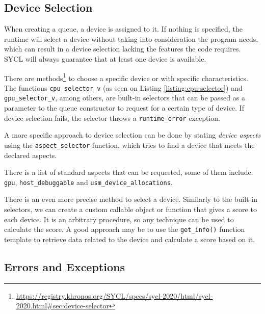 \subsection{Device Selection}

When creating a queue, a device is assigned to it.
If nothing is specified, the runtime will select a device without taking into consideration the program needs, which can result in a device selection lacking the features the code requires.
SYCL will always guarantee that at least one device is available.

There are methods\footnote{\url{https://registry.khronos.org/SYCL/specs/sycl-2020/html/sycl-2020.html\#sec:device-selector}} to choose a specific device or with specific characteristics.
The functions \texttt{cpu\_selector\_v} (as seen on Listing \ref{listing:cpu-selector}) and \texttt{gpu\_selector\_v}, among others, are built-in selectors that can be passed as a parameter to the queue constructor to request for a certain type of device.
If device selection fails, the selector throws a \texttt{runtime\_error} exception.
\pagebreak



A more specific approach to device selection can be done by stating \textit{device aspects} using the \texttt{aspect\_selector} function, which tries to find a device that meets the declared aspects.

There is a list of standard aspects that can be requested, some of them include: \texttt{gpu}, \texttt{host\_debuggable} and \texttt{usm\_device\_allocations}.

There is an even more precise method to select a device.
Similarly to the built-in selectors, we can create a custom callable object or function that gives a score to each device.
It is an arbitrary procedure, so any technique can be used to calculate the score.
A good approach may be to use the \texttt{get\_info()} function template to retrieve data related to the device and calculate a score based on it.

\subsection{Errors and Exceptions}

